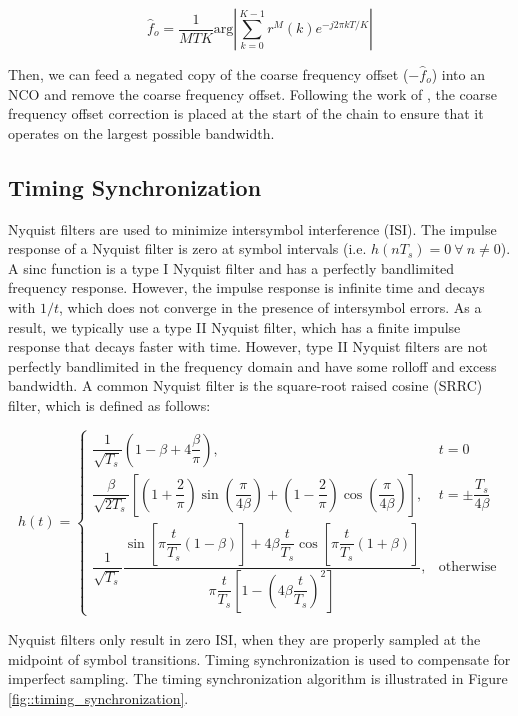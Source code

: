 \documentclass[conference,onecolumn]{IEEEtran}
\begin{document}
\begin{equation}
	\hat{f}_o = \frac{1}{MTK}\text{arg}\left|\sum_{k=0}^{K-1}{r^M(k)e^{-j2{\pi}kT/K}}\right|
\end{equation}

\noindent Then, we can feed a negated copy of the coarse frequency offset ($-\hat{f}_o$) into an NCO and remove the coarse frequency offset. Following the work of \cite{collins_2018_softwaredefined}, the coarse frequency offset correction is placed at the start of the chain to ensure that it operates on the largest possible bandwidth.
 
\subsection{Timing Synchronization}

Nyquist filters are used to minimize intersymbol interference (ISI). The impulse response of a Nyquist filter is zero at symbol intervals (i.e. $h(nT_s) = 0 \ \forall\ n \neq 0$). A sinc function is a type I Nyquist filter and has a perfectly bandlimited frequency response. However, the impulse response is infinite time and decays with $1/t$, which does not converge in the presence of intersymbol errors. As a result, we typically use a type II Nyquist filter, which has a finite impulse response that decays faster with time. However, type II Nyquist filters are not perfectly bandlimited in the frequency domain and have some rolloff and excess bandwidth. A common Nyquist filter is the square-root raised cosine (SRRC) filter, which is defined as follows:
 
\begin{equation}
	h(t) = \begin{cases}
		\dfrac{1}{\sqrt{T_s}}\left(1 - \beta + 4\dfrac{\beta}{\pi}\right), & t = 0 \\[12pt]
		\dfrac{\beta}{\sqrt{2T_s}}\left[\left(1 + \dfrac{2}{\pi}\right)\sin\left(\dfrac{\pi}{4\beta}\right)+ \left(1-\dfrac{2}{\pi}\right)\cos\left(\dfrac{\pi}{4\beta}\right)\right], & t = \pm\dfrac{T_s}{4\beta} \\[12pt]
		\dfrac{1}{\sqrt{T_s}}\dfrac{\sin\left[\pi\dfrac{t}{T_s}(1-\beta)\right]+4\beta\dfrac{t}{T_s}\cos\left[\pi\dfrac{t}{T_s}(1+\beta)\right]}{\pi\dfrac{t}{T_s}\left[1 - \left(4\beta\dfrac{t}{T_s}\right)^2\right]}, & \text{otherwise}
	\end{cases}
	\label{eq::srrc_filter}
\end{equation}

\noindent Nyquist filters only result in zero ISI, when they are properly sampled at the midpoint of symbol transitions. Timing synchronization is used to compensate for imperfect sampling. The timing synchronization algorithm is illustrated in Figure \ref{fig::timing_synchronization}.
\end{document}
